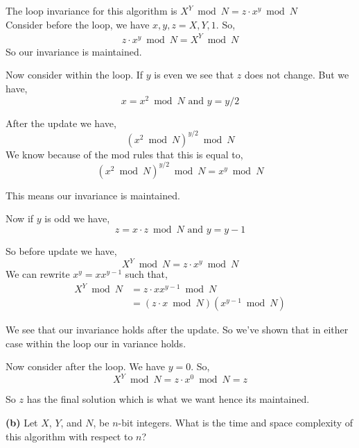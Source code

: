 \documentclass[12pt]{article}
\newcommand{\question}[3][Q]{
\begin{description}
\item \textbf{#1{#2}} #3
\end{description}
}
\begin{document}
\begin{answer}
    The loop invariance for this algorithm is $X^{Y} \bmod N = z \cdot x^{y} \bmod N$ \\
    Consider before the loop, we have $x,y,z =X,Y,1$. So,  
    \begin{align*}
        z \cdot x^{y}\bmod N =  X^{Y} \bmod N
    \end{align*}
    So our invariance is maintained.

    Now consider within the loop. If $y$ is even we see that $z$ does not change. But we have, 
    $$ x = x^2 \bmod N \text{ and } y = y /2 $$ 

    After the update we have, 
    $$ (x^2 \bmod N)^{y /2} \bmod N $$ 
    We know because of the mod rules that this is equal to, 
    $$ (x^2 \bmod N)^{y /2} \bmod N  = x^{y} \bmod N$$ 

    This means our invariance is maintained.

    Now if $y$ is odd we have, 
    $$ z = x \cdot z \bmod N \text{ and } y = y - 1 $$ 

    So before update we have, 
    $$ X^{Y} \bmod N = z \cdot x^{y}\bmod N$$ 
    We can rewrite $x^{y} = x x^{y - 1}$  such that, 
    \begin{align*}
        X^{Y} \bmod N &= z \cdot x x^{y - 1}\bmod N\\
                      &= (z \cdot x \bmod N) (x^{y - 1} \bmod N)
    \end{align*}

    We see that our invariance holds after the update. So we've shown that in either case within the loop our in variance holds. 


    Now consider after the loop. We have $y = 0$. So,  
    $$ X^{Y} \bmod N = z \cdot x^{0} \bmod N  = z$$

    So $z$ has the final solution which is what we want hence its maintained.
    

\end{answer}

\question[]{(b)}{
    Let $X$, $Y$, and $N$, be $n$-bit integers. What is the time and space complexity of this algorithm with respect to $n$?
}
\end{document}
